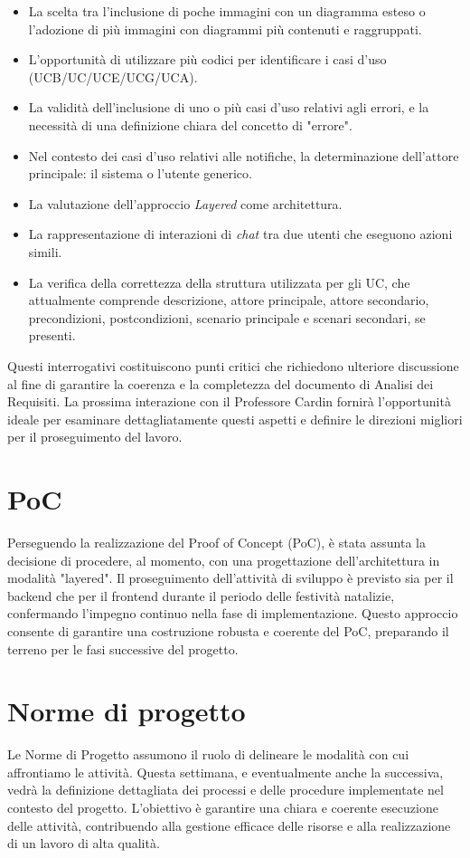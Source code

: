 	\begin{itemize}
		\item La scelta tra l'inclusione di poche immagini con un diagramma esteso o l'adozione di più immagini con diagrammi più contenuti e raggruppati.
		\item L'opportunità di utilizzare più codici per identificare i casi d'uso (UCB/UC/UCE/UCG/UCA).
		\item La validità dell'inclusione di uno o più casi d'uso relativi agli errori, e la necessità di una definizione chiara del concetto di "errore".
		\item Nel contesto dei casi d'uso relativi alle notifiche, la determinazione dell'attore principale: il sistema o l'utente generico.
		\item La valutazione dell'approccio \textit{Layered} come architettura.
		\item La rappresentazione di interazioni di \textit{chat} tra due utenti che eseguono azioni simili.
		\item La verifica della correttezza della struttura utilizzata per gli UC, che attualmente comprende descrizione, 
			  attore principale, attore secondario, precondizioni, postcondizioni, scenario principale e scenari secondari, se presenti.
	\end{itemize}

Questi interrogativi costituiscono punti critici che richiedono ulteriore discussione al fine di garantire la coerenza 
e la completezza del documento di Analisi dei Requisiti. 
La prossima interazione con il Professore Cardin fornirà l'opportunità ideale per esaminare dettagliatamente questi aspetti 
e definire le direzioni migliori per il proseguimento del lavoro.



\section{PoC}
Perseguendo la realizzazione del Proof of Concept (PoC), è stata assunta la decisione di procedere, al momento, con una progettazione dell'architettura 
in modalità "layered". 
Il proseguimento dell'attività di sviluppo è previsto sia per il backend che per il frontend durante il periodo delle festività natalizie, 
confermando l'impegno continuo nella fase di implementazione. 
Questo approccio consente di garantire una costruzione robusta e coerente del PoC, preparando il terreno per le fasi successive del progetto.


\section{Norme di progetto}
Le Norme di Progetto assumono il ruolo di delineare le modalità con cui affrontiamo le attività. 
Questa settimana, e eventualmente anche la successiva, vedrà la definizione dettagliata dei processi e delle procedure 
implementate nel contesto del progetto. 
L'obiettivo è garantire una chiara e coerente esecuzione delle attività, contribuendo alla gestione efficace delle 
risorse e alla realizzazione di un lavoro di alta qualità.


